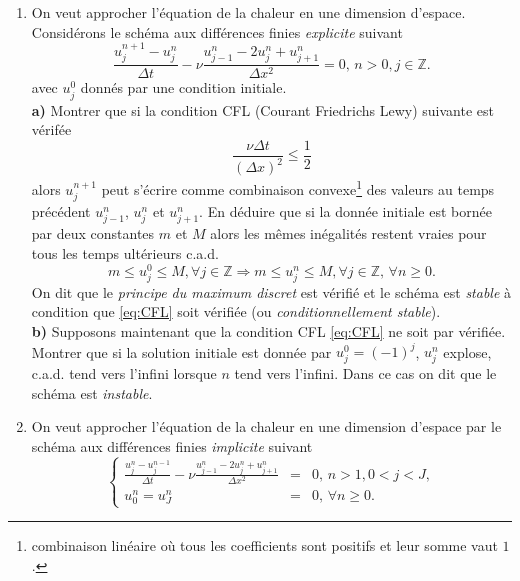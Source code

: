 \documentclass[12pt,a4paper]{article}
\begin{document}
\begin{enumerate}
\item On veut approcher l'\'equation de la chaleur en une dimension
  d'espace. Consid\'erons le sch\'ema aux diff\'erences finies {\it explicite}
  suivant
\begin{equation}
\frac{u_j^{n+1}-u_j^n}{\Delta
  t}-\nu\frac{u_{j-1}^n-2u_j^n+u_{j+1}^n}{\Delta x^2} = 0,\, n >0,
j\in \mathbb{Z}.
\end{equation}
avec $u_j^0$ donn\'es par une condition initiale.\\
{\bf a)} Montrer que si la condition CFL (Courant Friedrichs Lewy) suivante est
v\'erif\'ee
\begin{equation}\label{eq:CFL}
\frac{\nu\Delta t}{(\Delta x)^2}\le \frac{1}{2}
\end{equation}
alors $u_j^{n+1}$ peut s'\'ecrire comme combinaison
convexe\footnote{combinaison lin\'eaire o\`u tous les coefficients
  sont positifs et leur somme vaut $1$.} des
valeurs au temps pr\'ec\'edent $u_{j-1}^n$, $u_{j}^n$ et
$u_{j+1}^n$. En d\'eduire que si la donn\'ee initiale est born\'ee par
deux constantes $m$ et $M$ alors les m\^emes in\'egalit\'es restent
vraies pour tous les temps ult\'erieurs c.a.d.
\begin{equation}\label{eq:max}
m\le u_j^0\le M, \forall j\in\mathbb{Z} \Rightarrow m\le u_j^n\le M,
\forall j\in\mathbb{Z},\, \forall n\ge 0.
\end{equation}
On dit que le {\it principe du maximum discret} est v\'erifi\'e et le
sch\'ema est {\it stable} \`a condition que \eqref{eq:CFL} soit
v\'erifi\'ee (ou {\it conditionnellement stable}). \\
{\bf b)} Supposons maintenant que la condition CFL \eqref{eq:CFL} ne soit par
v\'erifi\'ee. Montrer que si la solution initiale est donn\'ee par
$u_j^0=(-1)^j$, $u_j^n$ explose, c.a.d. tend vers l'infini lorsque $n$
tend vers l'infini. Dans ce cas on dit que le sch\'ema est {\it instable}.
\item On veut approcher l'\'equation de la chaleur en une dimension
  d'espace par le sch\'ema aux diff\'erences finies {\it implicite}
  suivant 
\begin{equation}
\left\{\begin{array}{lcl}
\displaystyle\frac{u_j^{n}-u_j^{n-1}}{\Delta
  t}-\nu\frac{u_{j-1}^n-2u_j^n+u_{j+1}^n}{\Delta x^2} &=& 0,\, n >1,
0<j<J,\\[2ex]
u_0^n = u_J^n & = &0,\, \forall n\ge 0.
\end{array}\right.
\end{equation}

\end{enumerate}
\end{document}
